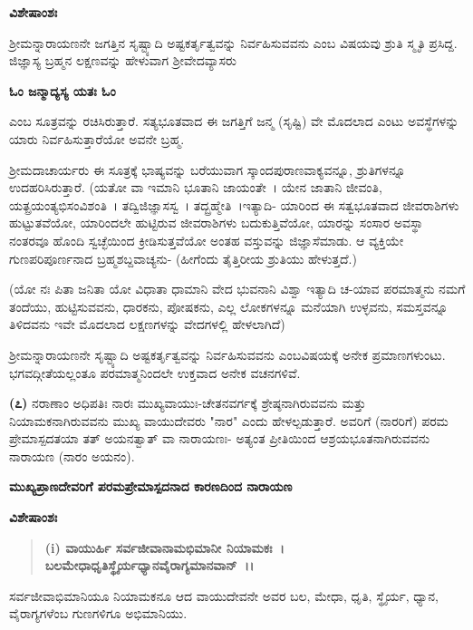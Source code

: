 \noindent
\textbf{ವಿಶೇಷಾಂಶಃ\enginline{-}}

ಶ‍್ರೀಮನ್ನಾರಾಯಣನೇ ಜಗತ್ತಿನ ಸೃಷ್ಟ್ಯಾದಿ ಅಷ್ಟಕರ್ತೃತ್ವವನ್ನು ನಿರ್ವಹಿಸುವವನು ಎಂಬ ವಿಷಯವು ಶ್ರುತಿ ಸ್ಮೃತಿ ಪ್ರಸಿದ್ದ. ಜಿಜ್ಞಾಸ್ಯ ಬ್ರಹ್ಮನ ಲಕ್ಷಣವನ್ನು ಹೇಳುವಾಗ ಶ‍್ರೀವೇದವ್ಯಾಸರು

\begin{center}
\textbf{ಓಂ ಜನ್ಮಾದ್ಯಸ್ಯ ಯತಃ ಓಂ}
\end{center}

ಎಂಬ ಸೂತ್ರವನ್ನು ರಚಿಸಿರುತ್ತಾರೆ. ಸತ್ಯಭೂತವಾದ ಈ ಜಗತ್ತಿಗೆ ಜನ್ಮ (ಸೃಷ್ಟಿ) ವೇ ಮೊದಲಾದ ಎಂಟು ಅವಸ್ಥೆಗಳನ್ನು ಯಾರು ನಿರ್ವಹಿಸುತ್ತಾರೆಯೋ ಅವನೇ ಬ್ರಹ್ಮ.

ಶ‍್ರೀಮದಾಚಾರ್ಯರು ಈ ಸೂತ್ರಕ್ಕೆ ಭಾಷ್ಯವನ್ನು ಬರೆಯುವಾಗ ಸ್ಕಾಂದಪುರಾಣವಾಕ್ಯವನ್ನೂ, ಶ್ರುತಿಗಳನ್ನೂ ಉದಹರಿಸಿರುತ್ತಾರೆ. (ಯತೋ ವಾ ಇಮಾನಿ ಭೂತಾನಿ ಜಾಯಂತೇ~। ಯೇನ ಜಾತಾನಿ ಜೀವಂತಿ, ಯತ್ಪ್ರಯಂತ್ಯಭಿಸಂವಿಶಂತಿ~। ತದ್ವಿಜಿಜ್ಞಾಸಸ್ವ~। ತದ್ಬ್ರಹ್ಮೇತಿ~।\break ಇತ್ಯಾದಿ- ಯಾರಿಂದ ಈ ಸತ್ವಭೂತವಾದ ಜೀವರಾಶಿಗಳು ಹುಟ್ಟುತವೆಯೋ, ಯಾರಿಂದಲೇ ಹುಟ್ಟಿರುವ ಜೀವರಾಶಿಗಳು ಬದುಕುತ್ತಿವೆಯೋ, ಯಾರನ್ನು ಸಂಸಾರ ಅವಸ್ಥಾ ನಂತರವೂ ಹೊಂದಿ ಸ್ವಚ್ಛೆಯಿಂದ ಕ್ರೀಡಿಸುತ್ತವೆಯೋ ಅಂತಹ ವಸ್ತುವನ್ನು ಜಿಜ್ಞಾಸೆಮಾಡು. ಆ ವ್ಯಕ್ತಿಯೇ ಗುಣಪರಿಪೂರ್ಣನಾದ ಬ್ರಹ್ಮಶಬ್ದವಾಚ್ಯನು- (ಹೀಗೆಂದು ತೈತ್ತಿರೀಯ ಶ್ರುತಿಯು ಹೇಳುತ್ತದೆ.)

(ಯೋ ನಃ ಪಿತಾ ಜನಿತಾ ಯೋ ವಿಧಾತಾ ಧಾಮಾನಿ ವೇದ ಭುವನಾನಿ ವಿಶ್ವಾ ಇತ್ಯಾದಿ ಚ-ಯಾವ ಪರಮಾತ್ಮನು ನಮಗೆ ತಂದೆಯು, ಹುಟ್ಟಿಸುವವನು, ಧಾರಕನು, ಪೋಷಕನು, ಎಲ್ಲ ಲೋಕಗಳನ್ನೂ ಮನೆಯಾಗಿ ಉಳ್ಳವನು, ಸಮಸ್ತವನ್ನೂ ತಿಳಿದವನು ಇವೇ ಮೊದಲಾದ ಲಕ್ಷಣಗಳನ್ನು ವೇದಗಳಲ್ಲಿ ಹೇಳಲಾಗಿದೆ)

ಶ‍್ರೀಮನ್ನಾರಾಯಣನೇ ಸೃಷ್ಟ್ಯಾದಿ ಅಷ್ಟಕರ್ತೃತ್ವವನ್ನು ನಿರ್ವಹಿಸುವವನು ಎಂಬ\break ವಿಷಯಕ್ಕೆ ಅನೇಕ ಪ್ರಮಾಣಗಳುಂಟು. ಭಗವದ್ಗೀತೆಯಲ್ಲಂತೂ ಪರಮಾತ್ಮನಿಂದಲೇ ಉಕ್ತವಾದ ಅನೇಕ ವಚನಗಳಿವೆ.

\textbf{(೭)} ನರಾಣಾಂ ಅಧಿಪತಿಃ ನಾರಃ ಮುಖ್ಯವಾಯುಃ-ಚೇತನವರ್ಗಕ್ಕೆ ಶ್ರೇಷ್ಠನಾಗಿರುವವನು ಮತ್ತು ನಿಯಾಮಕನಾಗಿರುವವನು ಮುಖ್ಯ ವಾಯುದೇವರು "ನಾರ" ಎಂದು ಹೇಳಲ್ಪಡುತ್ತಾರೆ. ಅವರಿಗೆ (ನಾರರಿಗೆ) ಪರಮ ಪ್ರೇಮಾಸ್ಪದತಯಾ ತತ್ ಅಯನತ್ವಾತ್ ವಾ ನಾರಾಯಣಃ- ಅತ್ಯಂತ ಪ್ರೀತಿಯಿಂದ ಆಶ್ರಯಭೂತನಾಗಿರುವವನು ನಾರಾಯಣ (ನಾರಂ ಅಯನಂ).

\begin{center}
\textbf{ಮುಖ್ಯಪ್ರಾಣದೇವರಿಗೆ ಪರಮಪ್ರೇಮಾಸ್ಪದನಾದ ಕಾರಣದಿಂದ ನಾರಾಯಣ}
\end{center}

\noindent
\textbf{ವಿಶೇಷಾಂಶಃ\enginline{-}}

\begin{verse}
\textbf{(i) ವಾಯುರ್ಹಿ ಸರ್ವಜೀವಾನಾಮಭಿಮಾನೀ ನಿಯಾಮಕಃ~।}\\\textbf{ಬಲಮೇಧಾಧೃತಿಸ್ಥೈರ್ಯಧ್ಯಾನವೈರಾಗ್ಯಮಾನವಾನ್~।।}
\end{verse}


ಸರ್ವಜೀವಾಭಿಮಾನಿಯೂ ನಿಯಾಮಕನೂ ಆದ ವಾಯುದೇವನೇ ಅವರ ಬಲ, ಮೇಧಾ, ಧೃತಿ, ಸ್ಥೈರ್ಯ, ಧ್ಯಾನ, ವೈರಾಗ್ಯಗಳೆಂಬ ಗುಣಗಳಿಗೂ ಅಭಿಮಾನಿಯು.

